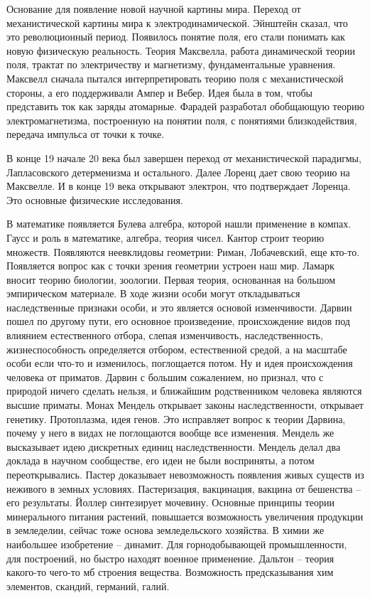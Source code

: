 \documentclass[a4paper, 12pt]{article}
\begin{document}
Основание для появление новой научной картины мира. Переход от 
механистической картины мира к электродинамической. Эйнштейн сказал, что 
это революционный период. Появилось понятие поля, его стали понимать как 
новую физическую реальность. Теория Максвелла, работа динамической 
теории поля, трактат по электричеству и магнетизму, фундаментальные 
уравнения. Максвелл сначала пытался интерпретировать теорию поля 
с механистической стороны, а его поддерживали Ампер и Вебер. Идея была 
в том, чтобы представить ток как заряды атомарные. Фарадей разработал 
обобщающую теорию электромагнетизма, построенную на понятии поля, 
с понятиями близкодействия, передача импульса от точки к точке.

В конце 19 начале 20 века был завершен переход от механистической 
парадигмы, Лапласовского детерменизма и остального. Далее Лоренц дает 
свою теорию на Максвелле. И в конце 19 века открывают электрон, что 
подтверждает Лоренца. Это основные физические исследования.

В математике появляется Булева алгебра, которой нашли применение 
в компах. Гаусс и роль в математике, алгебра, теория чисел. Кантор 
строит теорию множеств. Появляются неевклидовы геометрии: Риман, 
Лобачевский, еще кто-то. Появляется вопрос как с точки зрения геометрии 
устроен наш мир. Ламарк вносит теорию биологии, зоологии. Первая теория, 
основанная на большом эмпирическом материале. В ходе жизни особи могут 
откладываться наследственные признаки особи, и это является основой 
изменчивости. Дарвин пошел по другому пути, его основное произведение, 
происхождение видов под влиянием естественного отбора, слепая 
изменчивость, наследственность, жизнеспособность определяется отбором, 
естественной средой, а на масштабе особи если что-то и изменилось, 
поглощается потом. Ну и идея происхождения человека от приматов. Дарвин 
с большим сожалением, но признал, что с природой ничего сделать нельзя, 
и ближайшим родственником человека являются высшие приматы. Монах 
Мендель открывает законы наследственности, открывает генетику. 
Протоплазма, идея генов. Это исправляет вопрос к теории Дарвина, почему 
у него в видах не поглощаются вообще все изменения. Мендель же 
высказывает идею дискретных единиц наследственности. Мендель делал два 
доклада в научном сообществе, его идеи не были восприняты, а потом 
переоткрывались. Пастер доказывает невозможность появления живых существ 
из неживого в земных условиях. Пастеризация, вакцинация, вакцина от 
бешенства -- его результаты. Йоллер синтезирует мочевину. Основные 
принципы теории минерального питания растений, повышается возможность 
увеличения продукции в земледелии, сейчас тоже основа земледельского 
хозяйства. В химии же наибольшее изобретение -- динамит. Для 
горнодобывающей промышленности, для построений, но быстро находят 
военное применение. Дальтон -- теория какого-то чего-то мб строения 
вещества. Возможность предсказывания хим элементов, скандий, германий, 
галий.
\end{document}
